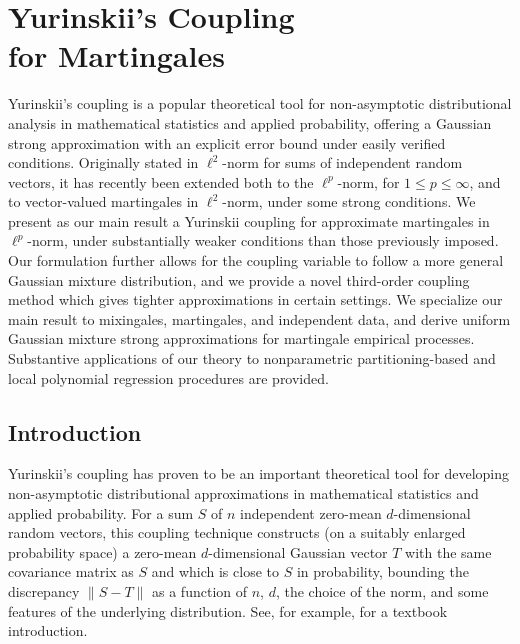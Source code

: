 \documentclass[11pt,lof]{puthesis}
\theoremstyle{break}
\theoremstyle{proof}
\begin{document}
\chapter[Yurinskii's Coupling for Martingales]%
{Yurinskii's Coupling \\ for Martingales}
\label{ch:yurinskii}

Yurinskii's coupling is a popular theoretical tool for non-asymptotic
distributional analysis in mathematical statistics and applied probability,
offering a Gaussian strong approximation with an explicit error bound under
easily verified conditions. Originally stated in $\ell^2$-norm for sums of
independent random vectors, it has recently been extended both to the
$\ell^p$-norm, for $1 \leq p \leq \infty$, and to vector-valued martingales in
$\ell^2$-norm, under some strong conditions. We present as our main result a
Yurinskii coupling for approximate martingales in $\ell^p$-norm, under
substantially weaker conditions than those previously imposed. Our formulation
further allows for the coupling variable to follow a more general Gaussian
mixture distribution, and we provide a novel third-order coupling method which
gives tighter approximations in certain settings. We specialize our main result
to mixingales, martingales, and independent data, and derive uniform Gaussian
mixture strong approximations for martingale empirical processes. Substantive
applications of our theory to nonparametric partitioning-based and local
polynomial regression procedures are provided.

\section{Introduction}

Yurinskii's coupling \citep{yurinskii1978error} has proven to be an important
theoretical tool for developing non-asymptotic distributional approximations in
mathematical statistics and applied probability. For a sum $S$ of $n$
independent zero-mean $d$-dimensional random vectors, this coupling technique
constructs (on a suitably enlarged probability space) a zero-mean
$d$-dimensional Gaussian vector $T$ with the same covariance matrix as $S$ and
which is close to $S$ in probability, bounding the discrepancy $\|S-T\|$ as a
function of $n$, $d$, the choice of the norm, and some features of the
underlying distribution. See, for example, \citet[Chapter 10]{pollard2002user}
for a textbook introduction.
\end{document}
